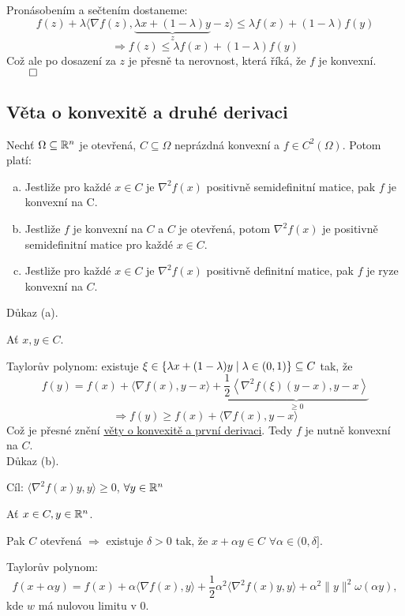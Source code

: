 Pronásobením a sečtením dostaneme:
\[
    f(z) + \lambda \langle \nabla f(z), \underbrace{\lambda x + (1-\lambda)y}_{z} - z\rangle \leq \lambda f(x) + 
    (1-\lambda)f(y)
\]
\[
    \Rightarrow f(z) \leq \lambda f(x) + (1-\lambda)f(y)
\]
Což ale po dosazení za $z$ je přesně ta nerovnost, která říká, že $f$ je konvexní. $\qed$

\subsection{Věta o konvexitě a druhé derivaci}\label{konvDDeriv}
Nechť $\Omega \subseteq \mathbb{R}^n$ je otevřená, $C \subseteq \Omega$ neprázdná konvexní a $f \in C^{2} (\Omega)$. Potom platí:
\begin{enumerate}[(a)]
    \item Jestliže pro každé $x \in C$ je $\nabla^2 f(x)$ positivně semidefinitní matice, pak $f$ je konvexní na C.
    \item Jestliže $f$ je konvexní na $C$ a $C$ je otevřená, potom $\nabla^2 f(x)$ je positivně semidefinitní matice pro 
    každé $x \in C$.
    \item Jestliže pro každé $x \in C$ je $\nabla^2 f(x)$ positivně definitní matice, pak $f$ je ryze konvexní na $C$. 
\end{enumerate}

Důkaz (a).

Ať $x, y \in C$.

Taylorův polynom: existuje $\xi \in \left\lbrace \lambda x + (1-\lambda)y \mid \lambda \in (0,1) \right\rbrace \subseteq C$ tak, že
\[
    f(y) = f(x) + \langle \nabla f(x), y-x\rangle + \underbrace{\frac{1}{2} \left\langle \nabla^2 f(\xi) (y-x), 
    y-x\right\rangle}_{\geq 0}
\]
\[
    \Rightarrow f(y) \geq f(x) + \langle \nabla f(x), y-x\rangle
\]
Což je přesné znění \hyperref[konvDeriv]{věty o konvexitě a první derivaci}. Tedy $f$ je nutně konvexní na $C$. 
\\
Důkaz (b).

Cíl: $\langle \nabla^2 f(x)y, y\rangle \geq 0$, $\forall y \in \mathbb{R}^n$

Ať $x \in C, y \in \mathbb{R}^n$.

Pak
$C$ otevřená $\Rightarrow$ existuje $\delta > 0$ tak, že $x + \alpha y \in C$ $\forall \alpha \in (0, \delta]$.

Taylorův polynom: 
\[
    f(x+ \alpha y) = f(x) + \alpha \langle \nabla f(x), y\rangle + \frac{1}{2}\alpha^2 \langle \nabla^2 f(x)y, y\rangle
    + \alpha^2 \| y\|^2 \omega(\alpha y),
\]
kde $w$ má nulovou limitu v $0$.

